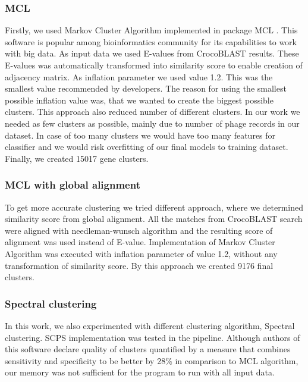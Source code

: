 \subsubsection{MCL}
Firstly, we used Markov Cluster Algorithm implemented in package MCL \cite{mcl}. 
This software is popular among bioinformatics community for its capabilities to work with big data.
As input data we used E-values from CrocoBLAST results.
These E-values was automatically transformed into similarity score to enable creation of adjacency matrix.
As inflation parameter we used value 1.2.
This was the smallest value recommended by developers.
The reason for using the smallest possible inflation value was, that we wanted to create the biggest possible clusters.
This approach also reduced number of different clusters.
In our work we needed as few clusters as possible, mainly due to number of phage records in our dataset.
In case of too many clusters we would have too many features for classifier and we would risk overfitting of our final models to training dataset.
Finally, we created 15017 gene clusters.

\subsubsection{MCL with global alignment}
To get more accurate clustering we tried different approach, where we determined similarity score from global alignment.
All the matches from CrocoBLAST search were aligned with needleman-wunsch algorithm \cite{needleman-wunsch} and the resulting score of alignment was used instead of E-value.
Implementation of Markov Cluster Algorithm was executed with inflation parameter of value 1.2, without any transformation of similarity score.
By this approach we created 9176 final clusters.

\subsubsection{Spectral clustering}
In this work, we also experimented with different clustering algorithm, Spectral clustering.
SCPS implementation\cite{scps} was tested in the pipeline.
Although authors of this software declare quality of clusters quantified by a measure that combines sensitivity and specificity to be better by 28\% in comparison to MCL algorithm, our memory was not sufficient for the program to run with all input data.
